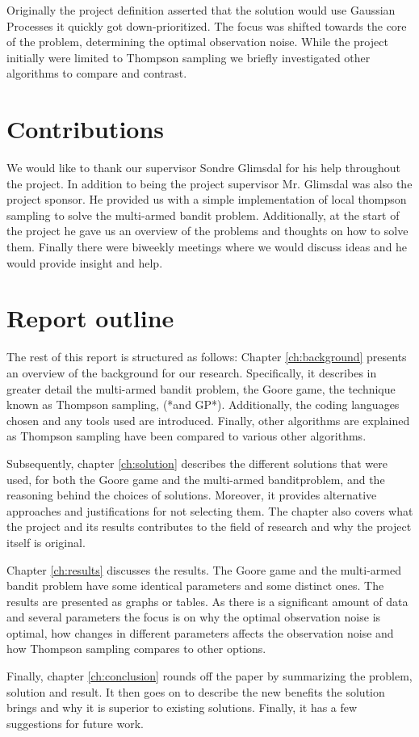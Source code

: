 Originally the project definition asserted that the solution would use Gaussian Processes it quickly got down-prioritized.
The focus was shifted towards the core of the problem, determining the optimal observation noise. While
the project initially were limited to Thompson sampling we briefly investigated other algorithms to compare
and contrast. 

\section{Contributions}
We would like to thank our supervisor Sondre Glimsdal for his help throughout the project. In addition to
being the project supervisor Mr. Glimsdal was also the project sponsor. He provided us with a simple
implementation of local thompson sampling to solve the multi-armed bandit problem. Additionally, at the 
start of the project he gave us an overview of the problems and thoughts on 
how to solve them. Finally there were biweekly meetings where we would discuss ideas and he would 
provide insight and help.

\section{Report outline}
The rest of this report is structured as follows: Chapter
\ref{ch:background} presents an overview of the background for our research.
Specifically, it describes in greater detail the multi-armed bandit problem, the Goore game, the
technique known as Thompson sampling, (*and GP*). Additionally, the coding languages chosen and any 
tools used are introduced. Finally, other algorithms are explained as Thompson sampling have been compared 
to various other algorithms.

Subsequently, chapter \ref{ch:solution} describes the different solutions that were used, for both the Goore game
and the multi-armed banditproblem, and the reasoning behind the choices of solutions. Moreover, it provides 
alternative approaches and justifications for not selecting them. The chapter also covers what the project
and its results contributes to the field of research and why the project itself is original. 

Chapter \ref{ch:results} discusses the results. The Goore game and the multi-armed bandit problem have some
identical parameters and some distinct ones. The results are presented as graphs or tables. As there is a significant
amount of data and several parameters the focus is on why the optimal observation noise is optimal, how changes
in different parameters affects the observation noise and how Thompson sampling compares to other options.

Finally, chapter \ref{ch:conclusion} rounds off the paper by summarizing the problem, solution and result. It then goes
on to describe the new benefits the solution brings and why it is superior to existing solutions. Finally, it has a few 
suggestions for future work. 
